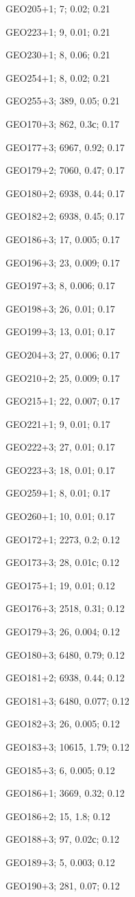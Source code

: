 GEO205+1; 7; 0.02; 0.21

GEO223+1; 9, 0.01; 0.21

GEO230+1; 8, 0.06; 0.21

GEO254+1; 8, 0.02; 0.21

GEO255+3; 389, 0.05; 0.21

GEO170+3; 862, 0.3с; 0.17

GEO177+3; 6967, 0.92; 0.17

GEO179+2; 7060, 0.47; 0.17

GEO180+2; 6938, 0.44; 0.17

GEO182+2; 6938, 0.45; 0.17

GEO186+3; 17, 0.005; 0.17

GEO196+3; 23, 0.009; 0.17

GEO197+3; 8, 0.006; 0.17

GEO198+3; 26, 0.01; 0.17

GEO199+3; 13, 0.01; 0.17

GEO204+3; 27, 0.006; 0.17

GEO210+2; 25, 0.009; 0.17

GEO215+1; 22, 0.007; 0.17

GEO221+1; 9, 0.01; 0.17

GEO222+3; 27, 0.01; 0.17

GEO223+3; 18, 0.01; 0.17

GEO259+1; 8, 0.01; 0.17

GEO260+1; 10, 0.01; 0.17

GEO172+1; 2273, 0.2; 0.12

GEO173+3; 28, 0.01с; 0.12

GEO175+1; 19, 0.01; 0.12

GEO176+3; 2518, 0.31; 0.12

GEO179+3; 26, 0.004; 0.12

GEO180+3; 6480, 0.79; 0.12

GEO181+2; 6938, 0.44; 0.12

GEO181+3; 6480, 0.077; 0.12

GEO182+3; 26, 0.005; 0.12

GEO183+3; 10615, 1.79; 0.12

GEO185+3; 6, 0.005; 0.12

GEO186+1; 3669, 0.32; 0.12

GEO186+2; 15, 1.8; 0.12

GEO188+3; 97, 0.02с; 0.12

GEO189+3; 5, 0.003; 0.12

GEO190+3; 281, 0.07; 0.12

